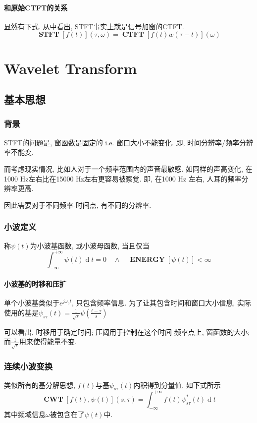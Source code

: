\documentclass{ctexart}
\DeclareMathOperator{\CWT}{\mathbf{CWT}}
\DeclareMathOperator{\CTFT}{\mathbf{CTFT}}
\DeclareMathOperator{\ENERGY}{\mathbf{ENERGY}}
\DeclareMathOperator{\ud}{\mathrm{d}}
\DeclareMathOperator{\STFT}{\mathbf{STFT}}
\begin{document}
\paragraph{和原始CTFT的关系} 显然有下式. 从中看出, STFT事实上就是信号加窗的CTFT.
    \[ \STFT[f(t)](\tau, \omega) = \CTFT[f(t)w(\tau-t)](\omega)\]

\section{Wavelet Transform}
\subsection{基本思想}
\subsubsection{背景}
    STFT的问题是, 窗函数是固定的 i.e. 窗口大小不能变化.
    即, 时间分辨率/频率分辨率不能变.\par
    而考虑现实情况, 比如人对于一个频率范围内的声音最敏感.
    如同样的声高变化, 在1000 Hz左右比在15000 Hz左右更容易被察觉.
    即, 在1000 Hz 左右, 人耳的频率分辨率更高.\par
    因此需要对于不同频率-时间点, 有不同的分辨率.
\subsubsection{小波定义}
    称$\psi(t)$为小波基函数, 或小波母函数, 当且仅当
    \[ \int_{-\infty}^{+\infty} \psi(t) \ud t = 0 
        \quad\land\quad
        \ENERGY[\psi(t)] < \infty \]
\paragraph{小波基的时移和压扩}
    单个小波基类似于$e^{j\omega_0 t}$, 只包含频率信息.
    为了让其包含时间和窗口大小信息, 实际使用的基是$
        \psi_{s\tau}(t) = \frac{1}{\sqrt{s}} \psi\left(\frac{t-\tau}{s}\right) $\par
    可以看出, 时移用于确定时间; 压阔用于控制在这个时间-频率点上, 窗函数的大小;
    而$\frac{1}{\sqrt{s}}$用来使得能量不变.
\subsubsection{连续小波变换}
    类似所有的基分解思想, $f(t)$与基$\psi_{s\tau}(t)$内积得到分量值, 如下式所示
    \[
        \CWT[f(t), \psi(t)](s, \tau) = \int_{-\infty}^{+\infty} f(t) \psi^*_{s\tau}(t) \ud t
    \]
    其中频域信息$\omega$被包含在了$\psi(t)$中.
\end{document}
